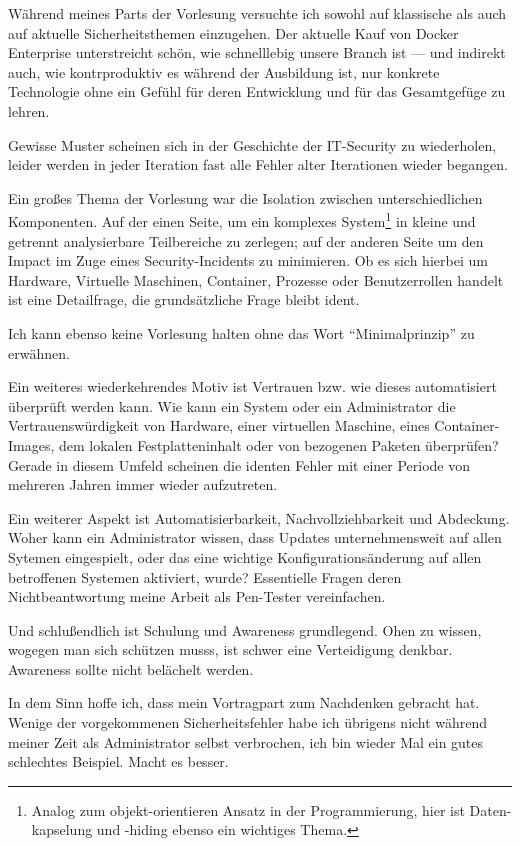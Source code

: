 \documentclass[11pt,fleqn,openany]{book} %
\begin{document}
Während meines Parts der Vorlesung versuchte ich sowohl auf klassische als auch auf aktuelle Sicherheitsthemen einzugehen. Der aktuelle Kauf von Docker Enterprise unterstreicht schön, wie schnelllebig unsere Branch ist --- und indirekt auch, wie kontrproduktiv es während der Ausbildung ist, nur konkrete Technologie ohne ein Gefühl für deren Entwicklung und für das Gesamtgefüge zu lehren.

Gewisse Muster scheinen sich in der Geschichte der IT-Security zu wiederholen, leider werden in jeder Iteration fast alle Fehler alter Iterationen wieder begangen.

Ein großes Thema der Vorlesung war die Isolation zwischen unterschiedlichen Komponenten. Auf der einen Seite, um ein komplexes System\footnote{Analog zum objekt-orientieren Ansatz in der Programmierung, hier ist Daten-kapselung und -hiding ebenso ein wichtiges Thema.} in kleine und getrennt analysierbare Teilbereiche zu zerlegen; auf der anderen Seite um den Impact im Zuge eines Security-Incidents zu minimieren. Ob es sich hierbei um Hardware, Virtuelle Maschinen, Container, Prozesse oder Benutzerrollen handelt ist eine Detailfrage, die grundsätzliche Frage bleibt ident.

Ich kann ebenso keine Vorlesung halten ohne das Wort ``Minimalprinzip'' zu erwähnen.

Ein weiteres wiederkehrendes Motiv ist Vertrauen bzw. wie dieses automatisiert überprüft werden kann. Wie kann ein System oder ein Administrator die Vertrauenswürdigkeit von Hardware, einer virtuellen Maschine, eines Container-Images, dem lokalen Festplatteninhalt oder von bezogenen Paketen überprüfen? Gerade in diesem Umfeld scheinen die identen Fehler mit einer Periode von mehreren Jahren immer wieder aufzutreten.

Ein weiterer Aspekt ist Automatisierbarkeit, Nachvollziehbarkeit und Abdeckung. Woher kann ein Administrator wissen, dass Updates unternehmensweit auf allen Sytemen eingespielt, oder das eine wichtige Konfigurationsänderung auf allen betroffenen Systemen aktiviert, wurde? Essentielle Fragen deren Nichtbeantwortung meine Arbeit als Pen-Tester vereinfachen.

Und schlußendlich ist Schulung und Awareness grundlegend. Ohen zu wissen, wogegen man sich schützen musss, ist schwer eine Verteidigung denkbar. Awareness sollte nicht belächelt werden.

In dem Sinn hoffe ich, dass mein Vortragpart zum Nachdenken gebracht hat. Wenige der vorgekommenen Sicherheitsfehler habe ich übrigens nicht während meiner Zeit als Administrator selbst verbrochen, ich bin wieder Mal ein gutes schlechtes Beispiel. Macht es besser.
\end{document}
